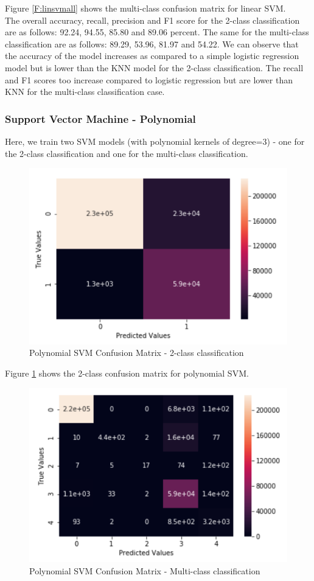 Figure \ref{F:linsvmall} shows the multi-class confusion matrix for linear SVM.\\
The overall accuracy, recall, precision and F1 score for the 2-class classification are as follows: 92.24, 94.55, 85.80 and 89.06 percent. The same for the multi-class classification are as follows: 89.29, 53.96, 81.97 and 54.22. We can observe that the accuracy of the model increases as compared to a simple logistic regression model but is lower than the KNN model for the 2-class classification. The recall and F1 scores too increase compared to logistic regression but are lower than KNN for the multi-class classification case.

\subsubsection{Support Vector Machine - Polynomial}
Here, we train two SVM models (with polynomial kernels of degree=3) - one for the 2-class classification and one for the multi-class classification. 
\begin{figure}
	\includegraphics[width=1.0\columnwidth]{images/svmpoly2.PNG}
	\caption{Polynomial SVM Confusion Matrix - 2-class classification}
	\label{F:polysvm2}
\end{figure}
Figure \ref{F:polysvm2} shows the 2-class confusion matrix for polynomial SVM.
\begin{figure}
	\includegraphics[width=1.0\columnwidth]{images/svmpolyall.PNG}
	\caption{Polynomial SVM Confusion Matrix - Multi-class classification}
	\label{F:polysvmall}
\end{figure}
